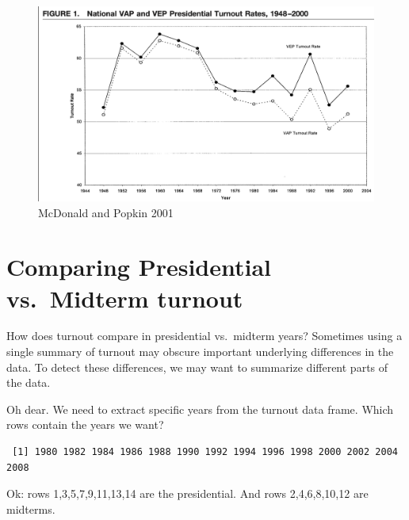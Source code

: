 \documentclass[
  letterpaper,
  DIV=11,
  numbers=noendperiod]{scrreprt}
\newenvironment{Shaded}{\begin{snugshade}}{\end{snugshade}}
\newcommand{\NormalTok}[1]{\textcolor[rgb]{0.00,0.23,0.31}{#1}}
\newcommand{\SpecialCharTok}[1]{\textcolor[rgb]{0.37,0.37,0.37}{#1}}
\begin{document}
\begin{figure}

{\centering \includegraphics{images/VEP.png}

}

\caption{McDonald and Popkin 2001}

\end{figure}

\hypertarget{comparing-presidential-vs.-midterm-turnout}{%
\section{Comparing Presidential vs.~Midterm
turnout}\label{comparing-presidential-vs.-midterm-turnout}}

How does turnout compare in presidential vs.~midterm years? Sometimes
using a single summary of turnout may obscure important underlying
differences in the data. To detect these differences, we may want to
summarize different parts of the data.

Oh dear. We need to extract specific years from the turnout data frame.
Which rows contain the years we want?

\begin{Shaded}
\end{Shaded}

\begin{verbatim}
 [1] 1980 1982 1984 1986 1988 1990 1992 1994 1996 1998 2000 2002 2004 2008
\end{verbatim}

Ok: rows 1,3,5,7,9,11,13,14 are the presidential. And rows 2,4,6,8,10,12
are midterms.
\end{document}
